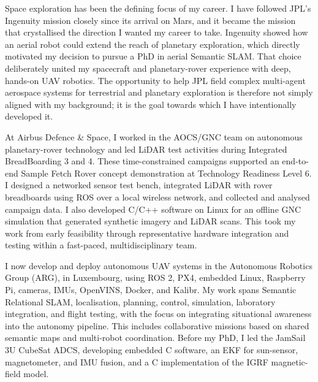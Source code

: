 \documentclass[10pt,a4paper]{article}
\newcommand{\BodySize}{9.25pt}
\newcommand{\BodyLineSize}{12.1pt}
\newcommand{\ParagraphSpacing}{10pt}       %
\newcommand{\LetterParagraph}[1]{%
    \noindent #1\par
    \addvspace{\ParagraphSpacing}%
}
\begin{document}
{\fontsize{\BodySize}{\BodyLineSize}\selectfont
    \color{CVDarkGray}

    \LetterParagraph{%
        Space exploration has been the defining focus of my career. I have followed
        JPL's Ingenuity mission closely since its arrival on Mars, and it became the
        mission that crystallised the direction I wanted my career to take. Ingenuity
        showed how an aerial robot could extend the reach of planetary exploration,
        which directly motivated my decision to pursue a PhD in aerial Semantic SLAM.
        That choice deliberately united my spacecraft and planetary-rover experience
        with deep, hands-on UAV robotics. The opportunity to help JPL field complex
        multi-agent aerospace systems for terrestrial and planetary exploration is
        therefore not simply aligned with my background; it is the goal towards which I
        have intentionally developed it.%
    }

    \LetterParagraph{%
        At Airbus Defence \& Space, I worked in the AOCS/GNC team on autonomous
        planetary-rover technology and led LiDAR test activities during Integrated
        BreadBoarding 3 and 4. These time-constrained campaigns supported an end-to-end
        Sample Fetch Rover concept demonstration at Technology Readiness Level 6. I
        designed a networked sensor test bench, integrated LiDAR with rover breadboards
        using ROS over a local wireless network, and collected and analysed campaign
        data. I also developed C/C++ software on Linux for an offline GNC simulation
        that generated synthetic imagery and LiDAR scans. This took my work from early
        feasibility through representative hardware integration and testing within a
        fast-paced, multidisciplinary team.%
    }

    \LetterParagraph{%
        I now develop and deploy autonomous UAV systems in the Autonomous Robotics
        Group (ARG), in Luxembourg, using ROS 2, PX4, embedded Linux, Raspberry
        Pi, cameras, IMUs, OpenVINS, Docker, and Kalibr. My work spans Semantic
        Relational SLAM, localisation, planning, control, simulation, laboratory
        integration, and flight testing, with the focus on integrating situational
        awareness into the autonomy pipeline. This includes collaborative missions based
        on shared semantic maps and multi-robot coordination. Before my PhD, I
        led the JamSail 3U CubeSat ADCS, developing embedded C software, an EKF
        for sun-sensor, magnetometer, and IMU fusion, and a C implementation of
        the IGRF magnetic-field model.%
    }

}
\end{document}
